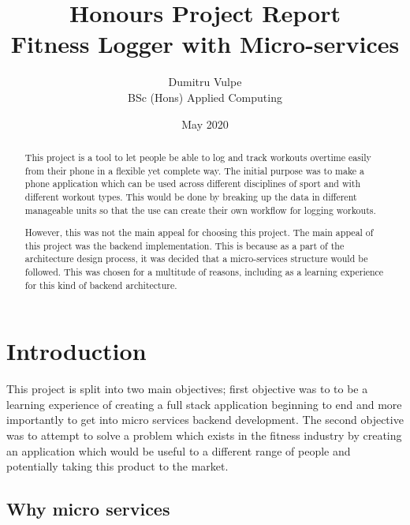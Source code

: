 \documentclass[twocolumn]{article}
\title{Honours Project Report\\Fitness Logger with Micro-services}
\author{Dumitru Vulpe\\BSc (Hons) Applied Computing}
\date{May 2020}
\begin{document}
\maketitle




\begin{abstract} 

This project is a tool to let people be able to log and track workouts overtime easily from their phone in a flexible yet complete way. The initial purpose was to make a phone application which can be used across different disciplines of sport and with different workout types. This would be done by breaking up the data in different manageable units so that the use can create their own workflow for logging workouts.

However, this was not the main appeal for choosing this project. The main appeal of this project was the backend implementation. This is because as a part of the architecture design process, it was decided that a micro-services structure would be followed. This was chosen for a multitude of reasons, including as a learning experience for this kind of backend architecture.

\end{abstract}

\section{Introduction}
\vspace{-1ex}

This project is split into two main objectives; first objective was to to be a learning experience of creating a full stack application beginning to end and more importantly to get into micro services backend development. The second objective was to attempt to solve a problem which exists in the fitness industry by creating an application which would be useful to a different range of people and potentially taking this product to the market.


\subsection{Why micro services}
\vspace{-1ex}
\end{document}
